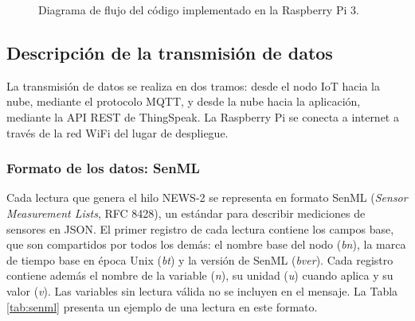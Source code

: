 \documentclass[11pt,a4paper]{article}
\begin{document}
\begin{figure}[H]
{%
}
\caption{Diagrama de flujo del código implementado en la Raspberry Pi 3.}
\label{fig:flujo_rpi}
\end{figure}


\subsection{Descripción de la transmisión de datos}

La transmisión de datos se realiza en dos tramos: desde el nodo IoT hacia la nube, mediante el protocolo MQTT, y desde la nube hacia la aplicación, mediante la API REST de ThingSpeak. La Raspberry Pi se conecta a internet a través de la red WiFi del lugar de despliegue.

\subsubsection{Formato de los datos: SenML}

Cada lectura que genera el hilo NEWS-2 se representa en formato SenML (\textit{Sensor Measurement Lists}, RFC 8428), un estándar para describir mediciones de sensores en JSON. El primer registro de cada lectura contiene los campos base, que son compartidos por todos los demás: el nombre base del nodo (\textit{bn}), la marca de tiempo base en época Unix (\textit{bt}) y la versión de SenML (\textit{bver}). Cada registro contiene además el nombre de la variable (\textit{n}), su unidad (\textit{u}) cuando aplica y su valor (\textit{v}). Las variables sin lectura válida no se incluyen en el mensaje. La Tabla \ref{tab:senml} presenta un ejemplo de una lectura en este formato.
\end{document}
